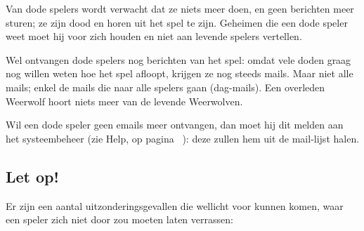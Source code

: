 \documentclass[12pt]{article}
\begin{document}
    Van dode spelers wordt verwacht dat ze niets meer doen, en geen berichten meer sturen; ze zijn dood en horen uit het spel te zijn. Geheimen die een dode speler weet moet hij voor zich houden en niet aan levende spelers vertellen. 
    
    Wel ontvangen dode spelers nog berichten van het spel: omdat vele doden graag nog willen weten hoe het spel afloopt, krijgen ze nog steeds mails. Maar niet alle mails; enkel de mails die naar alle spelers gaan (dag-mails). Een overleden Weerwolf hoort niets meer van de levende Weerwolven.
    
    Wil een dode speler geen emails meer ontvangen, dan moet hij dit melden aan het systeembeheer (zie Help, op pagina~\pageref{subsec:help} ): deze zullen hem uit de mail-lijst halen.
    
  \subsection{Let op!}
  
    Er zijn een aantal uitzonderingsgevallen die wellicht voor kunnen komen, waar een speler zich niet door zou moeten laten verrassen:
  
\end{document}
